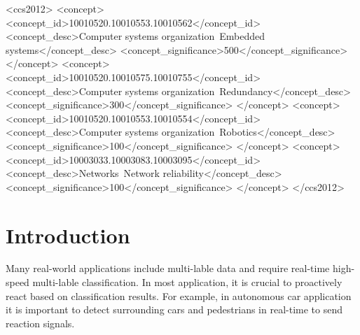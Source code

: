 \documentclass[sigconf]{acmart}
\begin{document}
%
%
\begin{CCSXML}
<ccs2012>
 <concept>
  <concept_id>10010520.10010553.10010562</concept_id>
  <concept_desc>Computer systems organization~Embedded systems</concept_desc>
  <concept_significance>500</concept_significance>
 </concept>
 <concept>
  <concept_id>10010520.10010575.10010755</concept_id>
  <concept_desc>Computer systems organization~Redundancy</concept_desc>
  <concept_significance>300</concept_significance>
 </concept>
 <concept>
  <concept_id>10010520.10010553.10010554</concept_id>
  <concept_desc>Computer systems organization~Robotics</concept_desc>
  <concept_significance>100</concept_significance>
 </concept>
 <concept>
  <concept_id>10003033.10003083.10003095</concept_id>
  <concept_desc>Networks~Network reliability</concept_desc>
  <concept_significance>100</concept_significance>
 </concept>
</ccs2012>
\end{CCSXML}


%



%
\maketitle

\section{Introduction}
Many real-world applications include multi-lable data and require real-time high-speed multi-lable classification. In most application, it is crucial to proactively react based on classification results. For example, in autonomous car application it is important to detect surrounding cars and pedestrians in real-time to send reaction signals. 










\end{document}
